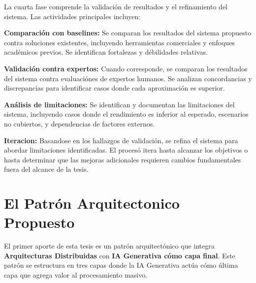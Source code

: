 \documentclass[12pt,a4paper,twoside]{book}
\begin{document}
La cuarta fase comprende la validación de resultados y el refinamiento del sistema. Las actividades principales incluyen:

\textbf{Comparación con baselines:} Se comparan los resultados del sistema propuesto contra soluciones existentes, incluyendo herramientas comerciales y enfoques académicos previos. Se identifican fortalezas y débilidades relativas.

\textbf{Validación contra expertos:} Cuando corresponde, se comparan los resultados del sistema contra evaluaciónes de expertos humanos. Se analizan concordancias y discrepancias para identificar casos donde cada aproximación es superior.

\textbf{Análisis de limitaciones:} Se identifican y documentan las limitaciones del sistema, incluyendo casos donde el rendimiento es inferior al esperado, escenarios no cubiertos, y dependencias de factores externos.

\textbf{Iteracion:} Basandose en los hallazgos de validación, se refina el sistema para abordar limitaciones identificadas. El procesó itera hasta alcanzar los objetivos o hasta determinar que las mejoras adicionales requieren cambios fundamentales fuera del alcance de la tesis.

\section{El Patrón Arquitectonico Propuesto}

El primer aporte de esta tesis es un patrón arquitectónico que integra \textbf{Arquitecturas Distribuidas} con \textbf{IA Generativa cómo capa final}. Este patrón se estructura en tres capas donde la IA Generativa actúa cómo última capa que agrega valor al procesamiento masivo.
\end{document}
